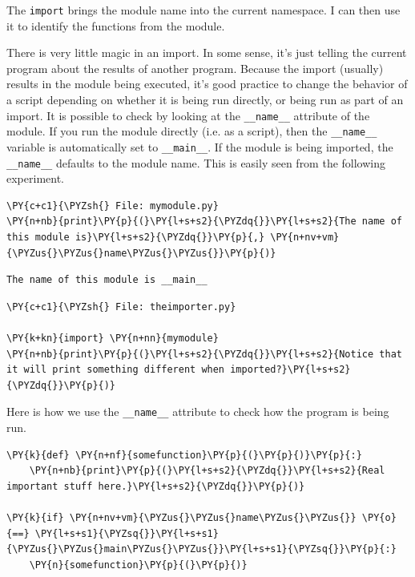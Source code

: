 The \texttt{import} brings the module name into the current namespace.  I can then use it to identify the functions from the module.  


There is very little magic in an import.  In some sense, it’s just telling the current program about the results of another program.  Because the import (usually) results in the module being executed, it’s good practice to change the behavior of a script depending on whether it is being run directly, or being run as part of an import.  It is possible to check by looking at the \texttt{\_\_name\_\_} attribute of the module.  If you run the module directly (i.e. as a script), then the \texttt{\_\_name\_\_} variable is automatically set to \texttt{\_\_main\_\_}.  If the module is being imported, the \texttt{\_\_name\_\_} defaults to the module name.  This is easily seen from the following experiment.


\begin{Verbatim}[commandchars=\\\{\}]
\PY{c+c1}{\PYZsh{} File: mymodule.py}
\PY{n+nb}{print}\PY{p}{(}\PY{l+s+s2}{\PYZdq{}}\PY{l+s+s2}{The name of this module is}\PY{l+s+s2}{\PYZdq{}}\PY{p}{,} \PY{n+nv+vm}{\PYZus{}\PYZus{}name\PYZus{}\PYZus{}}\PY{p}{)}
\end{Verbatim}

\begin{Verbatim}
The name of this module is __main__

\end{Verbatim}

\begin{Verbatim}[commandchars=\\\{\}]
\PY{c+c1}{\PYZsh{} File: theimporter.py}

\PY{k+kn}{import} \PY{n+nn}{mymodule}
\PY{n+nb}{print}\PY{p}{(}\PY{l+s+s2}{\PYZdq{}}\PY{l+s+s2}{Notice that it will print something different when imported?}\PY{l+s+s2}{\PYZdq{}}\PY{p}{)}
\end{Verbatim}



Here is how we use the \texttt{\_\_name\_\_} attribute to check how the program is being run.


\begin{Verbatim}[commandchars=\\\{\}]
\PY{k}{def} \PY{n+nf}{somefunction}\PY{p}{(}\PY{p}{)}\PY{p}{:}
    \PY{n+nb}{print}\PY{p}{(}\PY{l+s+s2}{\PYZdq{}}\PY{l+s+s2}{Real important stuff here.}\PY{l+s+s2}{\PYZdq{}}\PY{p}{)}

\PY{k}{if} \PY{n+nv+vm}{\PYZus{}\PYZus{}name\PYZus{}\PYZus{}} \PY{o}{==} \PY{l+s+s1}{\PYZsq{}}\PY{l+s+s1}{\PYZus{}\PYZus{}main\PYZus{}\PYZus{}}\PY{l+s+s1}{\PYZsq{}}\PY{p}{:}
    \PY{n}{somefunction}\PY{p}{(}\PY{p}{)}
\end{Verbatim}

